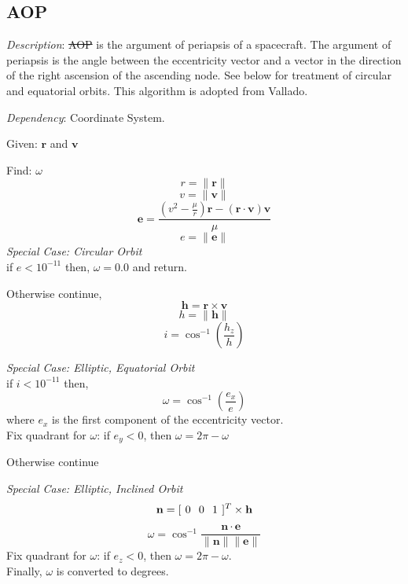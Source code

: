 \subsection{AOP} 

\noindent \textit{Description}: \st{AOP} is the argument of
periapsis of a spacecraft.  The argument of periapsis is the angle
between the eccentricity vector and a vector in the direction of the
right ascension of the ascending node.  See below for treatment of
circular and equatorial orbits.  This algorithm is adopted from
Vallado\cite{vallado2}.

\noindent \textit{Dependency}:  Coordinate System.

\noindent Given:  $\mathbf{r}$ and $\mathbf{v}$

\noindent Find:  $\omega$
\[
r = \| \mathbf{r} \|
\]
%
\[
v = \| \mathbf{v} \|
\]
%
\[
    \mathbf{e} = \displaystyle\frac{\left( v^2 - \displaystyle\frac{\mu}{r}  \right)\mathbf{r} - (\mathbf{r} \cdot \mathbf{v})\mathbf{v}}{\mu}
\]
%
\[
   e = \| \mathbf{e} \|
\]
%
\textit{Special Case:   Circular Orbit}\\
if $ e < 10^{-11}$  then, $\omega = 0.0$ and return.


\noindent Otherwise continue,
%
\[ \mathbf{h} = \mathbf{r} \times \mathbf{v} \]
%
\[ h = \| \mathbf{h} \| \]
%
\[ i = \cos^{-1}{\left(\frac{h_z}{h}  \right)}\]

\noindent \textit{Special Case:  Elliptic, Equatorial Orbit}\\
if $ i < 10^{-11}$ then,
%
\begin{equation}
    \omega = \cos^{-1}\left(\frac{e_x}{e}  \right)
\end{equation}
%
where $e_x$ is the first component of the eccentricity vector.\\
Fix quadrant for $\omega $: if $e_y < 0$, then $\omega = 2\pi -
\omega$

\noindent Otherwise continue

\noindent \textit{Special Case:  Elliptic, Inclined Orbit}\\
%
\[ \mathbf{n} = [\hspace{.05 in}0 \hspace{.1 in} 0 \hspace{.1 in} 1 \hspace{.05 in}]^T \times \mathbf{h} \]
%
\[ \omega = \cos^{-1}\frac{\mathbf{n}\cdot \mathbf{e}}{\| \mathbf{n}\|\|
\mathbf{e}\|}\]
%
Fix quadrant for $\omega $: if $e_z < 0$, then $\omega = 2\pi -
\omega$. \\Finally, $\omega$ is converted to degrees.
%
